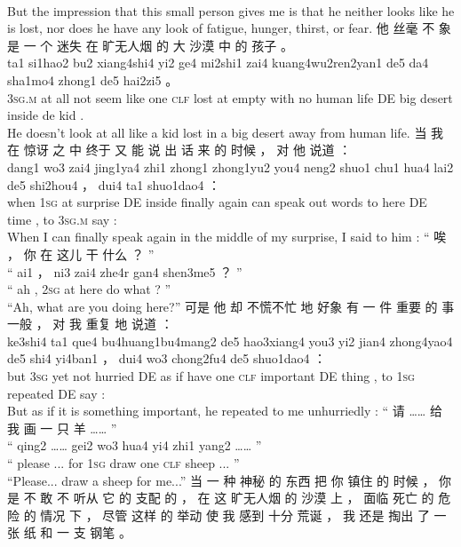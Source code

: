 \documentclass[UTF8]{ctexart}
\begin{document}
\begin{exe}
\\
\trans But the impression that this small person gives me is that he neither looks like he is lost, nor does he have any look of fatigue, hunger, thirst, or fear. 
\ex
\glll
他 丝毫 不 象是 一 个 迷失 在 旷无人烟 的 大 沙漠 中 的 孩子 。
\\
ta1 si1hao2 bu2 xiang4shi4 yi2 ge4 mi2shi1 zai4 kuang4wu2ren2yan1 de5 da4 sha1mo4 zhong1 de5 hai2zi5 。
\\
\textsc{3sg.m} {at all} not {seem like} one \textsc{clf} lost at {empty with no human life} DE big desert inside de kid .
\\
\trans He doesn't look at all like a kid lost in a big desert away from human life. 
\ex
\glll
当 我 在 惊讶 之 中 终于 又 能 说 出 话 来 的 时候 ， 对 他 说道 ：
\\
dang1 wo3 zai4 jing1ya4 zhi1 zhong1 zhong1yu2 you4 neng2 shuo1 chu1 hua4 lai2 de5 shi2hou4 ， dui4 ta1 shuo1dao4 ：
\\
when \textsc{1sg} at surprise DE inside finally again can speak out words {to here} DE time , to \textsc{3sg.m} say :
\\
\trans When I can finally speak again in the middle of my surprise, I said to him :
\ex
\glll
“ 唉 ， 你 在 这儿 干 什么 ？ ”
\\
“ ai1 ， ni3 zai4 zhe4r gan4 shen3me5 ？ ”
\\
`` ah , \textsc{2sg} at here do what ? ''
\\
\trans ``Ah, what are you doing here?''
\ex
\glll
可是 他 却 不慌不忙 地 好象 有 一 件 重要 的 事 一般 ， 对 我 重复 地 说道 ：
\\
ke3shi4 ta1 que4 bu4huang1bu4mang2 de5 hao3xiang4 you3 yi2 jian4 zhong4yao4 de5 shi4 yi4ban1 ， dui4 wo3 chong2fu4 de5 shuo1dao4 ：
\\
but \textsc{3sg} yet {not hurried} DE {as if} have one \textsc{clf} important DE thing {} , to \textsc{1sg} repeated DE say :
\\
\trans But as if it is something important, he repeated to me unhurriedly :
\ex
\glll
“ 请 …… 给 我 画 一 只 羊 …… ”
\\
“ qing2 …… gei2 wo3 hua4 yi4 zhi1 yang2 …… ”
\\
`` please ... for \textsc{1sg} draw one \textsc{clf} sheep ... ''
\\
\trans ``Please... draw a sheep for me...''
\ex
\glll
当 一 种 神秘 的 东西 把 你 镇住 的 时候 ， 你 是 不 敢 不 听从 它 的 支配 的 ， 在 这 旷无人烟 的 沙漠 上 ， 面临 死亡 的 危险 的 情况 下 ， 尽管 这样 的 举动 使 我 感到 十分 荒诞 ， 我 还是 掏出 了 一 张 纸 和 一 支 钢笔 。

\end{exe}
\end{document}
